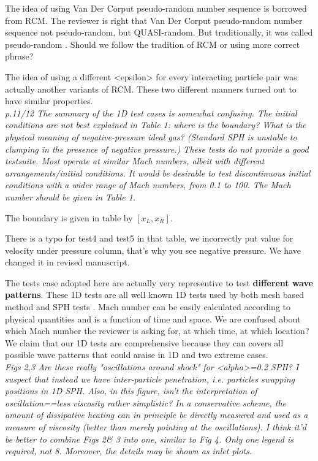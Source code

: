 \documentclass[10pt,a4paper]{article}
\begin{document}
The idea of using Van Der Corput pseudo-random number sequence is borrowed from RCM. The reviewer is right that Van Der Corput pseudo-random number sequence not pseudo-random, but QUASI-random. But traditionally, it was called pseudo-random \citep[][e.g.]{toro2013riemann}. Should we follow the tradition of RCM or using more correct phrase? 

The idea of using a different <epsilon> for every interacting particle pair was actually another variants of RCM. These two different manners turned out to have similar properties. 
\\[3pt]

\textit{p.11/12 The summary of the 1D test cases is somewhat confusing. The initial conditions are not best explained in Table 1: where is the boundary? What is the physical meaning of negative-pressure ideal gas? (Standard SPH is unstable to clumping in the presence of negative pressure.)
These tests do not provide a good testsuite. Most operate at similar Mach numbers, albeit with different arrangements/initial conditions. It would
be desirable to test discontinuous initial conditions with a wider range of Mach numbers, from 0.1 to 100. The Mach number should be given in Table 1.}

The boundary is given in table by $[x_L, x_R]$.

There is a typo for test4 and test5 in that table, we incorrectly put value for velocity under pressure column, that's why you see negative pressure. We have changed it in revised manuscript.

The tests case adopted here are actually very representive to test \textbf{different wave patterns}. These 1D tests are all well known 1D tests used by both mesh based method \citep[][e.g.]{toro2013riemann, leveque2002finite} and SPH tests \citep[][e.g.]{monaghan1983shock, cha2003implementations, puri2014approximate}. 
Mach number can be easily calculated according to physical quantities and is a function of time and space. We are confused about which Mach number the reviewer is asking for, at which time, at which location?
We claim that our 1D tests are comprehensive because they can covers all possible wave patterns that could araise in 1D and two extreme cases.
\\[3pt]

\textit{Figs 2,3 Are these really "oscillations around shock" for <alpha>=0.2 SPH? I suspect that instead we have inter-particle penetration, i.e.
particles swapping positions in 1D SPH. Also, in this figure, isn't the interpretation of oscillation==less viscosity rather simplistic? In a conservative scheme, the amount of dissipative heating can in principle be directly measured and used as a measure of viscosity (better than merely pointing at the oscillations).
I think it'd be better to combine Figs 2\& 3 into one, similar to Fig 4. Only one legend is required, not 8. Moreover, the details may be shown as inlet plots.}
\end{document}
